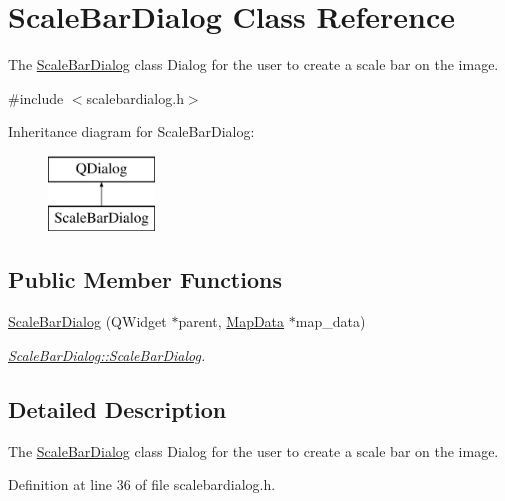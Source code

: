 \hypertarget{class_scale_bar_dialog}{}\section{Scale\+Bar\+Dialog Class Reference}
\label{class_scale_bar_dialog}


The \hyperlink{class_scale_bar_dialog}{Scale\+Bar\+Dialog} class Dialog for the user to create a scale bar on the image.  




{\ttfamily \#include $<$scalebardialog.\+h$>$}

Inheritance diagram for Scale\+Bar\+Dialog\+:\begin{figure}[H]
\begin{center}
\leavevmode
\includegraphics[height=2.000000cm]{class_scale_bar_dialog}
\end{center}
\end{figure}
\subsection*{Public Member Functions}
\begin{DoxyCompactItemize}
\item 
\hyperlink{class_scale_bar_dialog_a0cc858b9d08887f1a161986250de9e5d}{Scale\+Bar\+Dialog} (Q\+Widget $\ast$parent, \hyperlink{class_map_data}{Map\+Data} $\ast$map\+\_\+data)
\begin{DoxyCompactList}\small\item\em \hyperlink{class_scale_bar_dialog_a0cc858b9d08887f1a161986250de9e5d}{Scale\+Bar\+Dialog\+::\+Scale\+Bar\+Dialog}. \end{DoxyCompactList}\end{DoxyCompactItemize}


\subsection{Detailed Description}
The \hyperlink{class_scale_bar_dialog}{Scale\+Bar\+Dialog} class Dialog for the user to create a scale bar on the image. 

Definition at line 36 of file scalebardialog.\+h.




